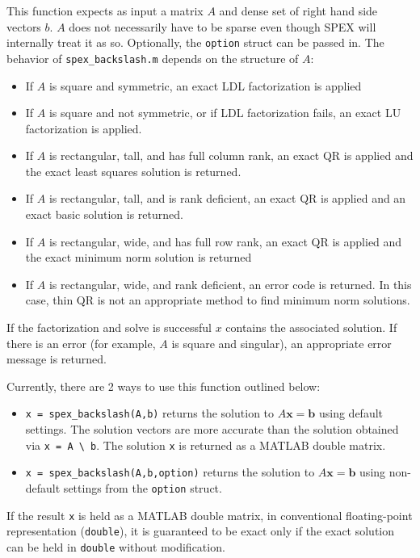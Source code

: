 \documentclass[12pt,oneside]{book}
\theoremstyle{definition}
\renewcommand{\b}{\mathbf{b}}
\newcommand{\x}{\mathbf{x}}
\begin{document}
This function expects as input a matrix $A$ and dense set of
right hand side vectors $b$. $A$ does not necessarily have to be sparse
even though SPEX will internally treat it as so.
Optionally, the \verb|option| struct can be passed in. The behavior of \verb|spex_backslash.m| depends on the structure of $A$:
\begin{itemize}
    \item If $A$ is square and symmetric, an exact LDL factorization is applied
    \item If $A$ is square and not symmetric, or if LDL factorization fails, an exact LU factorization is applied.
    \item If $A$ is rectangular, tall, and has full column rank, an exact QR is applied and the exact least squares solution is returned.
    \item If $A$ is rectangular, tall, and is rank deficient, an exact QR is applied and an exact basic solution is returned.
    \item If $A$ is rectangular, wide, and has full row rank, an exact QR is applied and the exact minimum norm solution is returned
    \item If $A$ is rectangular, wide, and rank deficient, an error code is returned. In this case, thin QR is not an appropriate method to find minimum norm solutions.
\end{itemize}

If the factorization and solve is successful $x$ contains the associated solution. If there is an error (for example, $A$ is square and singular), an appropriate error message is returned.
 
 Currently, there are 2 ways to use this function outlined below:

\begin{itemize}

\item \verb|x = spex_backslash(A,b)| returns the solution to $A \x =
\b$ using default settings. The solution vectors are more accurate than
the solution obtained via \verb|x = A \ b|.  The solution \verb|x| is
returned as a MATLAB double matrix.

\item \verb|x = spex_backslash(A,b,option)| returns the solution to $A \x =
\b$ using non-default settings from the \verb|option| struct.

\end{itemize}

If the result \verb|x| is held as a MATLAB double matrix, in conventional
floating-point representation (\verb|double|), it is guaranteed to be exact
only if the exact solution can be held in \verb|double| without modification.
\end{document}

